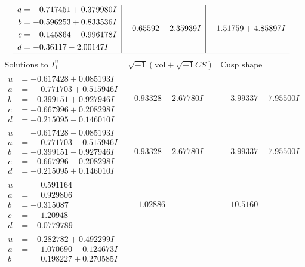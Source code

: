 \documentclass[1p]{elsarticle_modified}
\theoremstyle{definition}
\newcommand{\I}{\sqrt{-1}}
\begin{document}
$$\begin{array}{c|c|c}
\begin{aligned}
a &= \phantom{-}0.717451 + 0.379980 I \\
b &= -0.596253 + 0.833536 I \\
c &= -0.145864 - 0.996178 I \\
d &= -0.36117 - 2.00147 I\end{aligned}
 & \phantom{-}0.65592 - 2.35939 I & \phantom{-}1.51759 + 4.85897 I\\
 \hline 
 \end{array}$$\newpage$$\begin{array}{c|c|c}  
\text{Solutions to }I^u_{1}& \I (\text{vol} + \sqrt{-1}CS) & \text{Cusp shape}\\
 \hline 
\begin{aligned}
u &= -0.617428 + 0.085193 I \\
a &= \phantom{-}0.771703 + 0.515946 I \\
b &= -0.399151 + 0.927946 I \\
c &= -0.667996 + 0.208298 I \\
d &= -0.215095 - 0.146010 I\end{aligned}
 & -0.93328 - 2.67780 I & \phantom{-}3.99337 + 7.95500 I \\ \hline\begin{aligned}
u &= -0.617428 - 0.085193 I \\
a &= \phantom{-}0.771703 - 0.515946 I \\
b &= -0.399151 - 0.927946 I \\
c &= -0.667996 - 0.208298 I \\
d &= -0.215095 + 0.146010 I\end{aligned}
 & -0.93328 + 2.67780 I & \phantom{-}3.99337 - 7.95500 I \\ \hline\begin{aligned}
u &= \phantom{-}0.591164\phantom{ +0.000000I} \\
a &= \phantom{-}0.929806\phantom{ +0.000000I} \\
b &= -0.315087\phantom{ +0.000000I} \\
c &= \phantom{-}1.20948\phantom{ +0.000000I} \\
d &= -0.0779789\phantom{ +0.000000I}\end{aligned}
 & \phantom{-}1.02886\phantom{ +0.000000I} & \phantom{-}10.5160\phantom{ +0.000000I} \\ \hline\begin{aligned}
u &= -0.282782 + 0.492299 I \\
a &= \phantom{-}1.070690 - 0.124673 I \\
b &= \phantom{-}0.198227 + 0.270585 I \\

\end{aligned}
\end{array}$$
\end{document}

